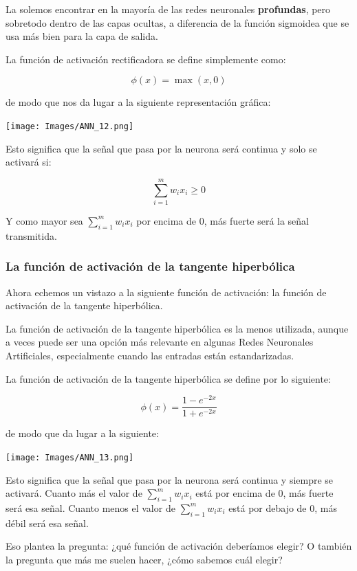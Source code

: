 \documentclass[
]{book}
\begin{document}
La solemos encontrar en la mayoría de las redes neuronales \textbf{profundas}, pero sobretodo dentro de las capas ocultas, a diferencia de la función sigmoidea que se usa más bien para la capa de salida.

La función de activación rectificadora se define simplemente como:

\[\phi(x) = \max(x,0)\]

de modo que nos da lugar a la siguiente representación gráfica:

\texttt{[image: Images/ANN\_12.png]}

Esto significa que la señal que pasa por la neurona será continua y solo se activará si:

\[\sum_{i=1}^m w_i x_i \ge 0\]

Y como mayor sea \(\sum_{i=1}^m w_i x_i\) por encima de 0, más fuerte será la señal transmitida.

\hypertarget{la-funciuxf3n-de-activaciuxf3n-de-la-tangente-hiperbuxf3lica}{%
\subsubsection{La función de activación de la tangente hiperbólica}\label{la-funciuxf3n-de-activaciuxf3n-de-la-tangente-hiperbuxf3lica}}

Ahora echemos un vistazo a la siguiente función de activación: la función de activación de la tangente hiperbólica.

La función de activación de la tangente hiperbólica es la menos utilizada, aunque a veces puede ser una opción más relevante en algunas Redes Neuronales Artificiales, especialmente cuando las entradas están estandarizadas.

La función de activación de la tangente hiperbólica se define por lo siguiente:

\[\phi(x) = \frac{1-e^{-2x}}{1+e^{-2x}}\]

de modo que da lugar a la siguiente:

\texttt{[image: Images/ANN\_13.png]}

Esto significa que la señal que pasa por la neurona será continua y siempre se activará. Cuanto más el valor de \(\sum_{i = 1}^m w_i x_i\) está por encima de 0, más fuerte será esa señal. Cuanto menos el valor de \(\sum_{i = 1}^m w_i x_i\) está por debajo de 0, más débil será esa señal.

Eso plantea la pregunta: ¿qué función de activación deberíamos elegir? O también la pregunta que más me suelen hacer, ¿cómo sabemos cuál elegir?
\end{document}
